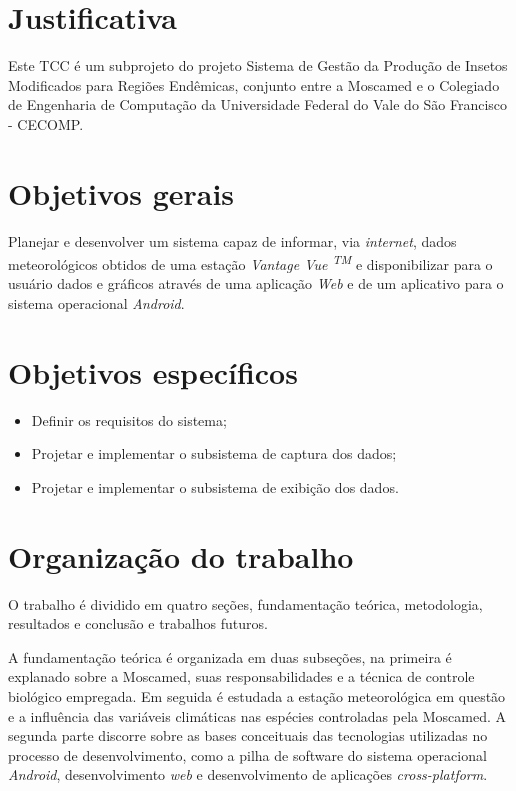 \section{Justificativa}

Este TCC é um subprojeto do projeto Sistema de Gestão da Produção de Insetos Modificados para Regiões Endêmicas, conjunto entre a Moscamed e o Colegiado de Engenharia de Computação da Universidade Federal do Vale do São Francisco - CECOMP.


\section{Objetivos gerais}

Planejar e desenvolver um sistema capaz de informar, via \textit{internet}, dados meteorológicos obtidos de uma estação \textit{Vantage Vue \textsuperscript{TM}} e disponibilizar para o usuário dados e gráficos através de uma aplicação \textit{Web} e de um aplicativo para o sistema operacional \textit{Android}.

\section{Objetivos específicos}

\begin{itemize}
	\item Definir os requisitos do sistema;
    \item Projetar e implementar o subsistema de captura dos dados;
    \item Projetar e implementar o subsistema de exibição dos dados.

\end{itemize}

\section{Organização do trabalho}

O trabalho é dividido em quatro seções, fundamentação teórica, metodologia, resultados e conclusão e trabalhos futuros.

A fundamentação teórica é organizada em duas subseções, na primeira é explanado sobre a Moscamed, suas responsabilidades e a técnica de controle biológico empregada. Em seguida é estudada a estação meteorológica em questão e a influência das variáveis climáticas nas espécies controladas pela Moscamed. A segunda parte discorre sobre as bases conceituais das tecnologias utilizadas no processo de desenvolvimento, como a pilha de software do sistema operacional \textit{Android}, desenvolvimento \textit{web} e desenvolvimento de aplicações \textit{cross-platform}.

